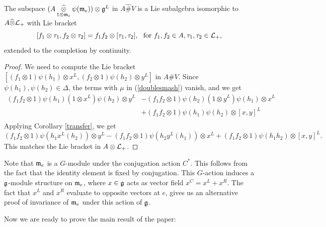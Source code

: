 \documentclass[12pt]{amsart}
\begin{document}
\begin{lemma}
\label{AL}
The subspace $(A \mathop{\widehat\otimes}\limits_{1 \otimes \mathfrak{m}_e} \psi (\mathfrak{m}_e)) \otimes \mathfrak{g}^L$ in $A \widehat\# V$ is a Lie subalgebra isomorphic to $A \widehat\otimes {\mathcal L}_+$
with Lie bracket 
$$[f_1 \otimes \tau_1, f_2 \otimes \tau_2] = f_1 f_2 \otimes [\tau_1, \tau_2],
\ \ \text{for } f_1, f_2 \in A, \tau_1, \tau_2 \in {\mathcal L}_+,$$ 
extended to the completion by continuity.
\end{lemma}
\begin{proof}
We need to compute the Lie bracket $[(f_1 \otimes 1) \psi(h_1) \otimes x^L,  (f_2 \otimes 1) \psi(h_2) \otimes y^L]$ in $A \# V$. Since $\psi(h_1), \psi(h_2) \in \Delta$, the terms with $\mu$ in (\ref{doublesmash}) vanish, and we get
\begin{align*}
(f_1 f_2 \otimes 1) \psi(h_1) (1 \otimes x^L) \psi(h_2) \otimes y^L
&- (f_1 f_2 \otimes 1) \psi(h_2) (1 \otimes y^L) \psi(h_1) \otimes x^L \\
&+ (f_1 f_2 \otimes 1) \psi(h_1) \psi(h_2) \otimes [x,y]^L \\
\end{align*}
Applying Corollary \ref{transfer}, we get
\begin{equation*}
(f_1 f_2 \otimes 1) \psi(h_1 x^L(h_2)) \otimes y^L
- (f_1 f_2 \otimes 1) \psi(h_2 y^L (h_1)) \otimes x^L 
+ (f_1 f_2 \otimes 1) \psi(h_1 h_2) \otimes [x,y]^L .
\end{equation*}
This matches the Lie bracket in $A \otimes {\mathcal L}_+$.
\end{proof}

Note that $\mathfrak{m}_e$ is a $G$-module under the conjugation action $C^*$. This follows from the fact that the identity element is fixed by conjugation. This $G$-action induces a $\mathfrak{g}$-module structure on $\mathfrak{m}_e$, where $x \in \mathfrak{g}$ acts as vector field $x^C = x^L + x^R$. The fact that $x^L$ and $x^R$ evaluate to opposite vectors at $e$, gives us an alternative proof of invariance of $\mathfrak{m}_e$ under this action of $\mathfrak{g}$.   

Now we are ready to prove the main result of the paper:
\end{document}
